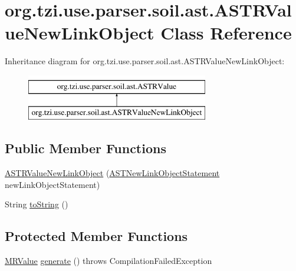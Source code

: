 \hypertarget{classorg_1_1tzi_1_1use_1_1parser_1_1soil_1_1ast_1_1_a_s_t_r_value_new_link_object}{\section{org.\-tzi.\-use.\-parser.\-soil.\-ast.\-A\-S\-T\-R\-Value\-New\-Link\-Object Class Reference}
\label{classorg_1_1tzi_1_1use_1_1parser_1_1soil_1_1ast_1_1_a_s_t_r_value_new_link_object}
}
Inheritance diagram for org.\-tzi.\-use.\-parser.\-soil.\-ast.\-A\-S\-T\-R\-Value\-New\-Link\-Object\-:\begin{figure}[H]
\begin{center}
\leavevmode
\includegraphics[height=2.000000cm]{classorg_1_1tzi_1_1use_1_1parser_1_1soil_1_1ast_1_1_a_s_t_r_value_new_link_object}
\end{center}
\end{figure}
\subsection*{Public Member Functions}
\begin{DoxyCompactItemize}
\item 
\hyperlink{classorg_1_1tzi_1_1use_1_1parser_1_1soil_1_1ast_1_1_a_s_t_r_value_new_link_object_ab1e46de754098c3048e18aecefb2cbea}{A\-S\-T\-R\-Value\-New\-Link\-Object} (\hyperlink{classorg_1_1tzi_1_1use_1_1parser_1_1soil_1_1ast_1_1_a_s_t_new_link_object_statement}{A\-S\-T\-New\-Link\-Object\-Statement} new\-Link\-Object\-Statement)
\item 
String \hyperlink{classorg_1_1tzi_1_1use_1_1parser_1_1soil_1_1ast_1_1_a_s_t_r_value_new_link_object_ad1a8268f055ab4e783c272c86c706280}{to\-String} ()
\end{DoxyCompactItemize}
\subsection*{Protected Member Functions}
\begin{DoxyCompactItemize}
\item 
\hyperlink{classorg_1_1tzi_1_1use_1_1uml_1_1sys_1_1soil_1_1_m_r_value}{M\-R\-Value} \hyperlink{classorg_1_1tzi_1_1use_1_1parser_1_1soil_1_1ast_1_1_a_s_t_r_value_new_link_object_ad914b1e3a99d62fcb671bfb4345ab81e}{generate} ()  throws Compilation\-Failed\-Exception 
\end{DoxyCompactItemize}
